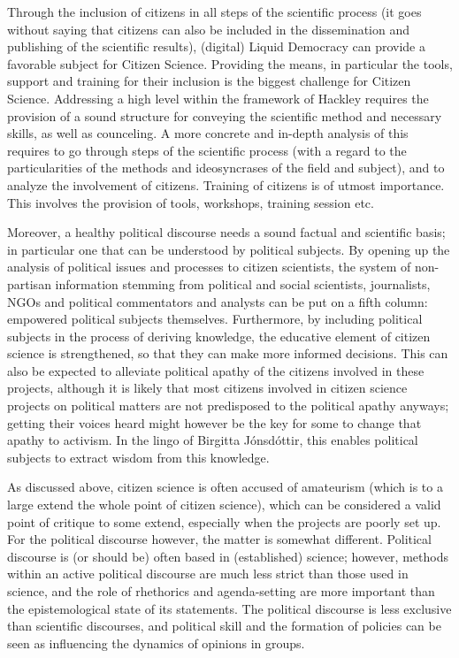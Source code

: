 Through the inclusion of citizens in all steps of the scientific process (it goes without saying that citizens can also be included in the dissemination and publishing of the scientific results), (digital) Liquid Democracy can provide a favorable subject for Citizen Science. Providing the means, in particular the tools, support and training for their inclusion is the biggest challenge for Citizen Science. Addressing a high level within the framework of Hackley requires the provision of a sound structure for conveying the scientific method and necessary skills, as well as counceling. 
A more concrete and in-depth analysis of this requires to go through steps of the scientific process (with a regard to the particularities of the methods and ideosyncrases of the field and subject), and to analyze the involvement of citizens. Training of citizens is of utmost importance. This involves the provision of tools, workshops, training session etc. 

Moreover, a healthy political discourse needs a sound factual and scientific basis; in particular one that can be understood by political subjects. By opening up the analysis of political issues and processes to citizen scientists, the system of non-partisan information stemming from political and social scientists, journalists, NGOs and political commentators and analysts can be put on a fifth column: empowered political subjects themselves. Furthermore, by including political subjects in the process of deriving knowledge, the educative element of citizen science is strengthened, so that they can make more informed decisions. This can also be expected to alleviate political apathy of the citizens involved in these projects, although it is likely that most citizens involved in citizen science projects on political matters are not predisposed to the political apathy anyways; getting their voices heard might however be the key for some to change that apathy to activism. In the lingo of Birgitta Jónsdóttir, this enables political subjects to extract wisdom from this knowledge.

As discussed above, citizen science is often accused of amateurism (which is to a large extend the whole point of citizen science), which can be considered a valid point of critique to some extend, especially when the projects are poorly set up. For the political discourse however, the matter is somewhat different. Political discourse is (or should be) often based in (established) science; however, methods within an active political discourse are much less strict than those used in science, and the role of rhethorics and agenda-setting are more important than the epistemological state of its statements. The political discourse is less exclusive than scientific discourses, and political skill and the formation of policies can be seen as influencing the dynamics of opinions in groups.

